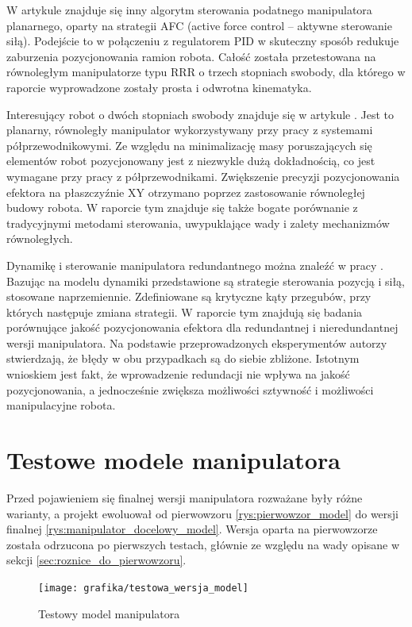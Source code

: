 \documentclass[printmode]{mgr}
\begin{document}
W artykule \cite{inne2} znajduje się inny algorytm sterowania podatnego manipulatora planarnego, oparty na
strategii AFC (active force control -- aktywne sterowanie siłą). Podejście to w połączeniu z regulatorem PID
w skuteczny sposób redukuje zaburzenia pozycjonowania ramion robota. Całość została przetestowana na równoległym manipulatorze typu RRR
o trzech stopniach swobody, dla którego w raporcie wyprowadzone zostały prosta i odwrotna kinematyka.

Interesujący robot o dwóch stopniach swobody znajduje się w artykule \cite{inne3}. Jest to planarny, równoległy manipulator 
wykorzystywany przy pracy z systemami półprzewodnikowymi. Ze względu na minimalizację masy poruszających się elementów
robot pozycjonowany jest z niezwykle dużą dokładnością, co jest wymagane przy pracy z półprzewodnikami. Zwiększenie precyzji
pozycjonowania efektora na płaszczyźnie XY otrzymano poprzez zastosowanie równoległej budowy robota. W raporcie tym znajduje
się także bogate porównanie z tradycyjnymi metodami sterowania, uwypuklające wady i zalety mechanizmów równoległych.

Dynamikę i sterowanie manipulatora redundantnego można znaleźć w pracy \cite{inne4}. Bazując na modelu dynamiki przedstawione
są strategie sterowania pozycją i siłą, stosowane naprzemiennie. Zdefiniowane są krytyczne kąty przegubów, przy których następuje zmiana
strategii. W raporcie tym znajdują się badania porównujące jakość pozycjonowania efektora dla redundantnej i nieredundantnej wersji manipulatora.
Na podstawie przeprowadzonych eksperymentów autorzy stwierdzają, że błędy w obu przypadkach są do siebie zbliżone. Istotnym wnioskiem jest
fakt, że wprowadzenie redundacji nie wpływa na jakość pozycjonowania, a jednocześnie zwiększa możliwości sztywność i możliwości manipulacyjne robota.

\section{Testowe modele manipulatora}
Przed pojawieniem się finalnej wersji manipulatora rozważane były różne warianty, a projekt ewoluował od pierwowzoru \ref{rys:pierwowzor_model}
do wersji finalnej \ref{rys:manipulator_docelowy_model}. Wersja oparta na pierwowzorze została odrzucona po pierwszych
testach, głównie ze względu na wady opisane w sekcji \ref{sec:roznice_do_pierwowzoru}. 
\begin{figure}[tp]
\centering
  \texttt{[image: grafika/testowa\_wersja\_model]}
  \caption{Testowy model manipulatora}
  \label{rys:testowa_wersja_model}  
\end{figure}
\end{document}
